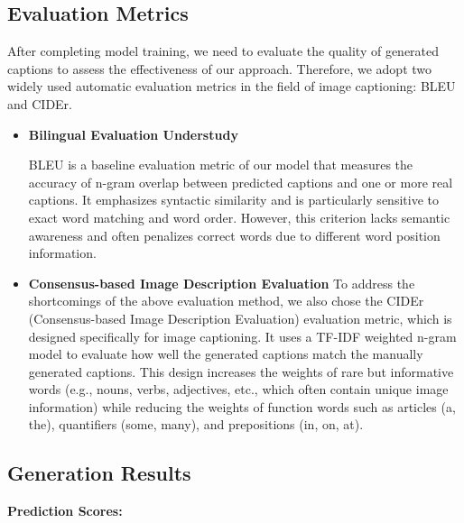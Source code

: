 \documentclass[11pt]{article}
\begin{document}
\subsection{Evaluation Metrics}
After completing model training, we need to evaluate the quality of generated captions to assess the effectiveness of our approach. Therefore, we adopt two widely used 
automatic evaluation metrics in the field of image captioning: BLEU and CIDEr.
\begin{itemize}
    \item \textbf{Bilingual Evaluation Understudy }
    
    BLEU is a baseline evaluation 
    metric of our model that measures the accuracy of n-gram overlap between predicted captions 
    and one or more real captions\cite{Papineni}. It emphasizes syntactic similarity and is particularly sensitive to exact word 
    matching and word order. However, this criterion lacks semantic awareness and often penalizes correct words due to different word position information.

    \item \textbf{Consensus-based Image Description Evaluation}
    To address the shortcomings of the above evaluation method, we also chose the CIDEr
     (Consensus-based Image Description Evaluation) \cite{vedantam2015cider}
     evaluation metric, which is designed specifically for image 
     captioning. It uses a TF-IDF weighted n-gram model to evaluate how well the 
     generated captions match the manually generated captions. This design increases the 
     weights of rare but informative words (e.g., nouns, verbs, adjectives, etc., which often contain unique image information) 
     while reducing the weights of function words such as articles (a, the), quantifiers (some, many), and prepositions (in, on, at).
\end{itemize}

\pagebreak
\subsection{Generation Results}
\textbf{Prediction Scores:}
\end{document}
